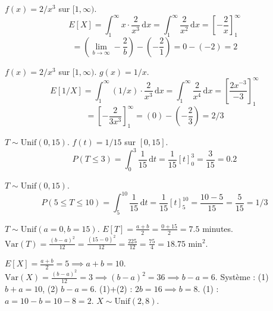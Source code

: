 \begin{correctionbox}
$f(x) = 2/x^3$ sur $[1, \infty)$.
$$E[X] = \int_1^\infty x \cdot \frac{2}{x^3} \, \mathrm{d}x = \int_1^\infty \frac{2}{x^2} \, \mathrm{d}x = \left[ -\frac{2}{x} \right]_1^\infty$$
$$= \left( \lim_{b \to \infty} -\frac{2}{b} \right) - \left( -\frac{2}{1} \right) = 0 - (-2) = 2$$
\end{correctionbox}

\begin{correctionbox}
$f(x) = 2/x^3$ sur $[1, \infty)$. $g(x) = 1/x$.
$$E[1/X] = \int_1^\infty (1/x) \cdot \frac{2}{x^3} \, \mathrm{d}x = \int_1^\infty \frac{2}{x^4} \, \mathrm{d}x = \left[ \frac{2x^{-3}}{-3} \right]_1^\infty$$
$$= \left[ -\frac{2}{3x^3} \right]_1^\infty = (0) - (-\frac{2}{3}) = 2/3$$
\end{correctionbox}

\begin{correctionbox}
$T \sim \text{Unif}(0, 15)$. $f(t) = 1/15$ sur $[0, 15]$.
$$P(T \le 3) = \int_0^3 \frac{1}{15} \, \mathrm{d}t = \frac{1}{15} [t]_0^3 = \frac{3}{15} = 0.2$$
\end{correctionbox}

\begin{correctionbox}
$T \sim \text{Unif}(0, 15)$.
$$P(5 \le T \le 10) = \int_5^{10} \frac{1}{15} \, \mathrm{d}t = \frac{1}{15} [t]_5^{10} = \frac{10-5}{15} = \frac{5}{15} = 1/3$$
\end{correctionbox}

\begin{correctionbox}
$T \sim \text{Unif}(a=0, b=15)$.
$E[T] = \frac{a+b}{2} = \frac{0+15}{2} = 7.5$ minutes.
$\text{Var}(T) = \frac{(b-a)^2}{12} = \frac{(15-0)^2}{12} = \frac{225}{12} = \frac{75}{4} = 18.75 \text{ min}^2$.
\end{correctionbox}

\begin{correctionbox}
$E[X] = \frac{a+b}{2} = 5 \implies a+b = 10$.
$\text{Var}(X) = \frac{(b-a)^2}{12} = 3 \implies (b-a)^2 = 36 \implies b-a = 6$.
Système : (1) $b+a=10$, (2) $b-a=6$.
(1)+(2) : $2b = 16 \implies b = 8$.
(1) : $a = 10 - b = 10 - 8 = 2$.
$X \sim \text{Unif}(2, 8)$.
\end{correctionbox}

